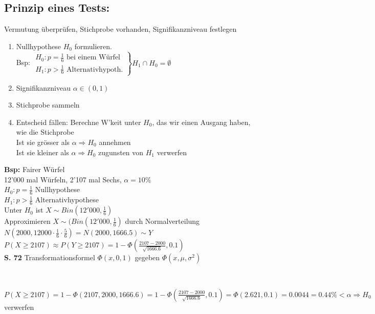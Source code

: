 \documentclass[a4paper,10pt]{article}
\newcommand{\Bold}[1]{\textbf{#1}} %
\newcommand{\T}[1]{\text{#1}} %
\newcommand{\Ra}{\Rightarrow}
\newcommand{\Brackar}[2]{\left.\begin{array}{#1} #2 \end{array}\right\rbrace} %
\newcommand{\Oneover}[1]{\frac{1}{#1}} %
\begin{document}
\subsection{Prinzip eines Tests:}
Vermutung überprüfen, Stichprobe vorhanden, Signifikanzniveau festlegen
\begin{enumerate}
 \item Nullhypothese $H_0$ formulieren. \\
Bsp: $\Brackar{r}{H_0:p=\Oneover{6}\T{ bei einem Würfel}\\
 H_1:p>\Oneover{6} \T{ Alternativhypoth.}}H_1\cap H_0=\emptyset$
 \item Signifikanzniveau $\alpha\in(0,1)$
 \item Stichprobe sammeln
 \item Entscheid fällen: Berechne W'keit unter $H_0$, das wir einen Ausgang haben, wie die Stichprobe\\
 Ist sie grösser als $\alpha\Ra H_0$ annehmen\\
 Ist sie kleiner als $\alpha\Ra H_0$ zugunsten von $H_1$ verwerfen
\end{enumerate}
\Bold{Bsp:} Fairer Würfel\\
12'000 mal Würfeln, 2'107 mal Sechs, $\alpha=10\%$\\
$H_0: p=\Oneover{6}$ Nullhypothese\\
$H_1:p>\Oneover{6}$ Alternativhypothese\\
Unter $H_0$ ist $X\sim Bin(12'000,\Oneover{6})$\\
Approximieren $X\sim(Bin(12'000,\Oneover{6})$ durch Normalverteilung\\ $N(2000,12000\cdot \Oneover{6}\cdot \frac{5}{6})=N(2000,1666.5)\sim Y$\\
$P(X\geq2107)\approx P(Y\geq2107)=1-\varPhi(\frac{2107-2000}{\sqrt{1666.6}},0.1)$\\
\Bold{S. 72} Transformationsformel $\varPhi(x,0,1)$ gegeben $\varPhi(x,\mu,\sigma^2)$
\begin{center}
 \\ 
\end{center}
$P(X\geq2107)=1-\varPhi(2107,2000,1666.6)=1-\varPhi(\frac{2107-2000}{\sqrt{1666.6}},0.1)=\varPhi(2.621,0.1)=0.0044=0.44\%<\alpha\Ra H_0$ verwerfen\\
\end{document}
